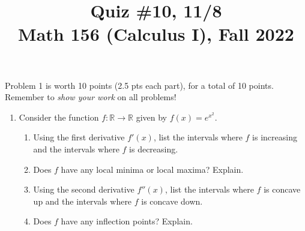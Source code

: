 \documentclass[11pt]{article}
\title{Quiz \#10, 11/8 \\ Math 156 (Calculus I), Fall 2022}
\date{}
\begin{document}
\maketitle

\thispagestyle{empty}

\vspace{-1cm}

Problem 1 is worth 10 points (2.5 pts each part), for a total of 10 points. Remember to \emph{show your work} on all problems!

\begin{enumerate}
\item Consider the function $f\colon \mathbb{R} \to \mathbb{R}$ given by $f(x) = e^{x^2}$.
\begin{enumerate}
\item Using the first derivative $f'(x)$, list the intervals where $f$ is increasing and the intervals where $f$ is decreasing.
\item Does $f$ have any local minima or local maxima? Explain.
\item Using the second derivative $f''(x)$, list the intervals where $f$ is concave up and the intervals where $f$ is concave down.
\item Does $f$ have any inflection points? Explain.
\end{enumerate}

\end{enumerate}
\end{document}
